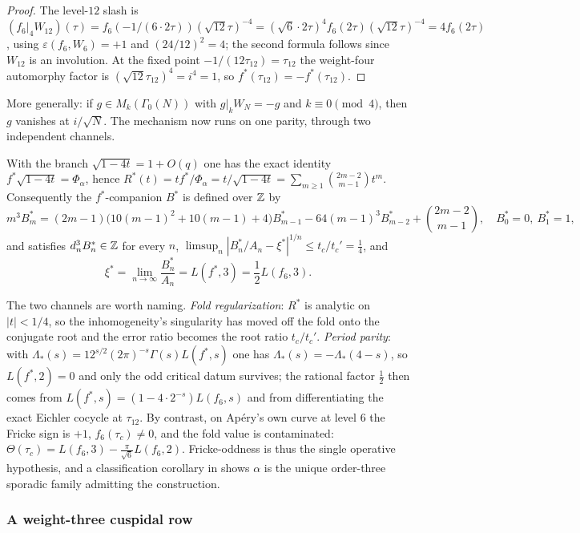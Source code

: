 \begin{proof}
The level-$12$ slash is
$(f_6|_4W_{12})(\tau)=f_6(-1/(6\cdot2\tau))(\sqrt{12}\tau)^{-4}
=(\sqrt6\cdot2\tau)^4f_6(2\tau)(\sqrt{12}\tau)^{-4}=4f_6(2\tau)$, using
$\varepsilon(f_6,W_6)=+1$ and $(24/12)^2=4$; the second formula follows since
$W_{12}$ is an involution.  At the fixed point $-1/(12\tau_{12})=\tau_{12}$
the weight-four automorphy factor is $(\sqrt{12}\tau_{12})^4=i^4=1$, so
$f^*(\tau_{12})=-f^*(\tau_{12})$.
\end{proof}

More generally: if $g\in M_k(\Gamma_0(N))$ with $g|_kW_N=-g$ and
$k\equiv0\pmod4$, then $g$ vanishes at $i/\sqrt N$.  The mechanism now runs on
one parity, through two independent channels.

\begin{theorem}
\label{thm:dombapp}
\Proved{} With the branch $\sqrt{1-4t}=1+O(q)$ one has the exact identity
$f^*\sqrt{1-4t}=\Phi_\alpha$, hence
$R^*(t)=t f^*/\Phi_\alpha=t/\sqrt{1-4t}=\sum_{m\ge1}\binom{2m-2}{m-1}t^m$.
Consequently the $f^*$-companion $B^*$ is defined over $\mathbb{Z}$ by
\[
m^3B^*_m=(2m-1)\bigl(10(m-1)^2+10(m-1)+4\bigr)B^*_{m-1}-64(m-1)^3B^*_{m-2}
+\binom{2m-2}{m-1},\quad B^*_0=0,\ B^*_1=1,
\]
and satisfies $d_n^3B^*_n\in\mathbb{Z}$ for every $n$,
$\limsup_n|B^*_n/A_n-\xi^*|^{1/n}\le t_c/t_c'=\tfrac14$, and
\[
\boxed{\ \xi^*=\lim_{n\to\infty}\frac{B^*_n}{A_n}=L(f^*,3)=\frac12L(f_6,3).\ }
\]
\end{theorem}

The two channels are worth naming.  \emph{Fold regularization}: $R^*$ is
analytic on $|t|<1/4$, so the inhomogeneity's singularity has moved off the
fold onto the conjugate root and the error ratio becomes the root ratio
$t_c/t_c'$.  \emph{Period parity}: with
$\Lambda_*(s)=12^{s/2}(2\pi)^{-s}\Gamma(s)L(f^*,s)$ one has
$\Lambda_*(s)=-\Lambda_*(4-s)$, so $L(f^*,2)=0$ and only the odd critical
datum survives; the rational factor $\tfrac12$ then comes from
$L(f^*,s)=(1-4\cdot2^{-s})L(f_6,s)$ and from differentiating the exact Eichler
cocycle at $\tau_{12}$.  By contrast, on Ap\'ery's own curve at level $6$ the
Fricke sign is $+1$, $f_6(\tau_c)\neq0$, and the fold value is contaminated:
$\Theta(\tau_c)=L(f_6,3)-\tfrac{\pi}{\sqrt6}L(f_6,2)$.  Fricke-oddness is thus
the single operative hypothesis, and a classification corollary in
\cite{ProjDomb} shows $\alpha$ is the unique order-three sporadic family
admitting the construction.

\subsubsection*{A weight-three cuspidal row}

